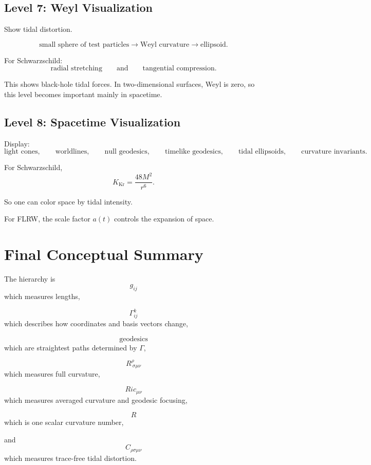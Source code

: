 \documentclass[12pt,a4paper]{article}
\theoremstyle{notespace}
\begin{document}
\subsection{Level 7: Weyl Visualization}

Show tidal distortion.

\[
\text{small sphere of test particles}
\longrightarrow
\text{Weyl curvature}
\longrightarrow
\text{ellipsoid}.
\]

For Schwarzschild:
\[
\text{radial stretching}
\qquad
\text{and}
\qquad
\text{tangential compression}.
\]

This shows black-hole tidal forces. In two-dimensional surfaces, Weyl is zero, so this level becomes important mainly in spacetime.

\subsection{Level 8: Spacetime Visualization}

Display:
\[
\text{light cones},
\qquad
\text{worldlines},
\qquad
\text{null geodesics},
\qquad
\text{timelike geodesics},
\qquad
\text{tidal ellipsoids},
\qquad
\text{curvature invariants}.
\]

For Schwarzschild,
\[
K_{\mathrm{Kr}}=\frac{48M^2}{r^6}.
\]

So one can color space by tidal intensity.

For FLRW, the scale factor \(a(t)\) controls the expansion of space.

\section{Final Conceptual Summary}

The hierarchy is
\[
\boxed{
	g_{ij}
}
\]
which measures lengths,

\[
\boxed{
	\Gamma^k_{ij}
}
\]
which describes how coordinates and basis vectors change,

\[
\boxed{
	\text{geodesics}
}
\]
which are straightest paths determined by \(\Gamma\),

\[
\boxed{
	R^\rho_{\ \sigma\mu\nu}
}
\]
which measures full curvature,

\[
\boxed{
	Ric_{\mu\nu}
}
\]
which measures averaged curvature and geodesic focusing,

\[
\boxed{
	R
}
\]
which is one scalar curvature number,

and
\[
\boxed{
	C_{\rho\sigma\mu\nu}
}
\]
which measures trace-free tidal distortion.
\end{document}
